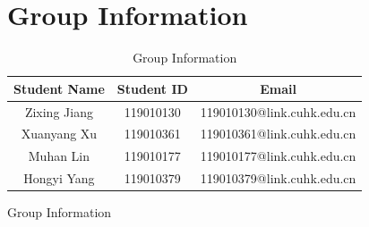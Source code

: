 \documentclass[10pt,a4paper]{article}
\begin{document}
\begin{figure}[H]
	\section{Group Information}
	\begin{table}[H]
		\centering
		\begin{tabular}{|c|c|c|}
			\hline
			\textbf{Student Name} & \textbf{Student ID} & \textbf{Email}\\ 
			\hline
			Zixing Jiang & 119010130 & 119010130@link.cuhk.edu.cn\\ 
			\hline
			Xuanyang Xu & 119010361 & 119010361@link.cuhk.edu.cn\\  
			\hline
			Muhan Lin & 119010177 & 119010177@link.cuhk.edu.cn\\ 
			\hline
			Hongyi Yang & 119010379 & 119010379@link.cuhk.edu.cn\\ 
			\hline
		\end{tabular}
		\caption{Group Information} 
		\label{tab:group}
	\end{table}

\end{figure}
\end{document}
